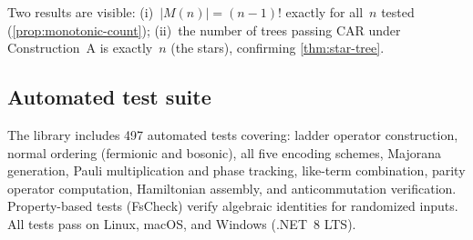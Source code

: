 Two results are visible: (i)~$|M(n)| = (n{-}1)!$ exactly for all~$n$
tested (\cref{prop:monotonic-count}); (ii)~the number of trees
passing CAR under Construction~A is exactly~$n$ (the stars),
confirming \cref{thm:star-tree}.

\subsection{Automated test suite}
\label{sec:val-tests}

The library includes 497 automated tests covering: ladder operator
construction, normal ordering (fermionic and bosonic), all five
encoding schemes, Majorana generation, Pauli multiplication and
phase tracking, like-term combination, parity operator computation,
Hamiltonian assembly, and anticommutation verification.  Property-based
tests (FsCheck) verify algebraic identities for randomized inputs.
All tests pass on Linux, macOS, and Windows (.NET~8 LTS).
